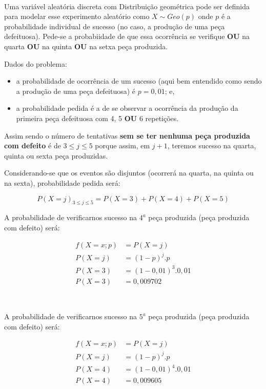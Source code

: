 \documentclass[
]{book}
\providecommand{\tightlist}{%
  \setlength{\itemsep}{0pt}\setlength{\parskip}{0pt}}
\begin{document}
~

Uma variável aleatória discreta com Distribuição geométrica pode ser definida para modelar esse experimento aleatório como \(X\sim Geo(p)\) onde \(p\) é a probabilidade individual de sucesso (no caso, a produção de uma peça defeituosa). Pede-se a probabiidade de que essa ocorrência se verifique \textbf{OU} na quarta \textbf{OU} na quinta \textbf{OU} na setxa peça produzida.

\hfill\break

Dados do problema:

\begin{itemize}
\tightlist
\item
  a probabilidade de ocorrência de um sucesso (aqui bem entendido como sendo a produção de uma peça defeituosa) é \(p=0,01\); e,\\
\item
  a probabilidade pedida é a de se observar a ocorrência da produção da primeira peça defeituosa com 4, 5 \textbf{OU} 6 repetições.
\end{itemize}

Assim sendo o número de tentativas \textbf{sem se ter nenhuma peça produzida com defeito} é de \(3 \le j \le 5\) porque assim, em \(j+1\), teremos sucesso na quarta, quinta ou sexta peça produzidas.

\hfill\break

Considerando-se que os eventos são disjuntos (ocorrerá na quarta, na quinta ou na sexta), probabilidade pedida será:

\[
P(X=j)_{3 \le j \le 5}= P(X=3) + P(X=4) + P(X=5)
\]

\hfill\break

A probabilidade de verificarnos sucesso na \(4^{a}\) peça produzida (peça produzida com defeito) será:

\hfill\break

\begin{align*}
f(X=x; p) & = P(X=j) \\
P(X=j)    & = (1-p)^{j} . p  \\
P(X=3)    & = (1-0,01)^{3} . 0,01 \\
P(X=3)    & = 0,009702
\end{align*}

~

A probabilidade de verificarnos sucesso na \(5^{a}\) peça produzida (peça produzida com defeito) será:

\begin{align*}
f(X=x; p) & = P(X=j) \\
P(X=j)    & = (1-p)^{j} . p \\
P(X=4)    & = (1-0,01)^{4} . 0,01 \\
P(X=4)   & = 0,009605
\end{align*}
\end{document}
